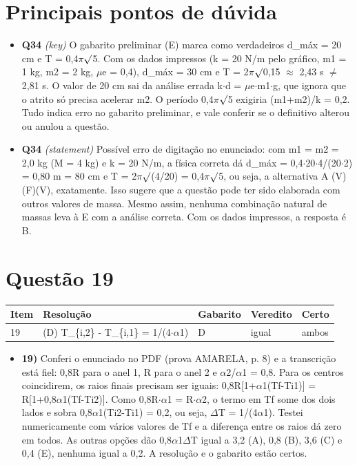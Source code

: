 \documentclass{article}%
\begin{document}
\section*{Principais pontos de dúvida}%
\begin{itemize}%
\item%
\textbf{Q34} \textit{(key)} O gabarito preliminar (E) marca como verdadeiros d\_máx = 20 cm e T = 0,4$\pi$$\surd$5. Com os dados impressos (k = 20 N/m pelo gráfico, m1 = 1 kg, m2 = 2 kg, $\mu$e = 0,4), d\_máx = 30 cm e T = 2$\pi$$\surd$0,15 $\approx$ 2,43 s $\neq$ 2,81 s. O valor de 20 cm sai da análise errada k$\cdot$d = $\mu$e$\cdot$m1$\cdot$g, que ignora que o atrito só precisa acelerar m2. O período 0,4$\pi$$\surd$5 exigiria (m1+m2)/k = 0,2. Tudo indica erro no gabarito preliminar, e vale conferir se o definitivo alterou ou anulou a questão.%
\item%
\textbf{Q34} \textit{(statement)} Possível erro de digitação no enunciado: com m1 = m2 = 2,0 kg (M = 4 kg) e k = 20 N/m, a física correta dá d\_máx = 0,4$\cdot$20$\cdot$4/(20$\cdot$2) = 0,80 m = 80 cm e T = 2$\pi$$\surd$(4/20) = 0,4$\pi$$\surd$5, ou seja, a alternativa A (V)(F)(V), exatamente. Isso sugere que a questão pode ter sido elaborada com outros valores de massa. Mesmo assim, nenhuma combinação natural de massas leva à E com a análise correta. Com os dados impressos, a resposta é B.%
\end{itemize}%
\section*{Questão 19}%
\begin{longtable}{@{}p{} p{} p{} p{} p{}@{}}\toprule Item & Resolução & Gabarito & Veredito & Certo \\ \midrule
19 & (D) T\_\{i,2\} - T\_\{i,1\} = 1/(4$\cdot$$\alpha$1) & D & igual & ambos \\
\bottomrule\end{longtable}%
\begin{itemize}%
\item%
\textbf{19)} Conferi o enunciado no PDF (prova AMARELA, p. 8) e a transcrição está fiel: 0,8R para o anel 1, R para o anel 2 e $\alpha$2/$\alpha$1 = 0,8. Para os centros coincidirem, os raios finais precisam ser iguais: 0,8R{[}1+$\alpha$1(Tf-Ti1){]} = R{[}1+0,8$\alpha$1(Tf-Ti2){]}. Como 0,8R$\cdot$$\alpha$1 = R$\cdot$$\alpha$2, o termo em Tf some dos dois lados e sobra 0,8$\alpha$1(Ti2-Ti1) = 0,2, ou seja, $\Delta$T = 1/(4$\alpha$1). Testei numericamente com vários valores de Tf e a diferença entre os raios dá zero em todos. As outras opções dão 0,8$\alpha$1$\Delta$T igual a 3,2 (A), 0,8 (B), 3,6 (C) e 0,4 (E), nenhuma igual a 0,2. A resolução e o gabarito estão certos.%
\end{itemize}%
\end{document}

